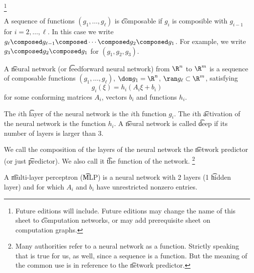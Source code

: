 
  \ifhmode\unskip\fi\footnote{
Future editions will include. Future editions may change the name of this sheet to \t{computation networks}, or may add prerequisite sheet on computation graphs.
  }


A sequence of functions $(g_1, \dots , g_\ell )$ is \t{composable} if $g_i$ is composible with $g_{i-1}$ for $i = 2, \dots , \ell $.
In this case we write $g_\ell  \composed g_{\ell -1} \composed \cdots \composed g_2 \composed g_1$. For example, we write $g_3 \composed g_2 \composed g_1$ for $(g_1, g_2, g_3)$.

A \t{neural network} (or \t{feedforward neural network}) from $\R ^n$ to $\R ^m$ is a sequence of composable functions $(g_1, \dots , g_{\ell })$, $\dom g_1 = \R ^n$, $\ran g_\ell  \subset \R ^m$, satisfying
  \[
g_i(\xi ) = h_i(A_i \xi  + b_i)
  \]
for some conforming matrices $A_i$, vectors $b_i$ and functions $h_i$.

The $i$th \t{layer} of the neural network is the $i$th function $g_i$.
The $i$th \t{activation} of the neural network is the function $h_i$.
A \t{neural network} is called \t{deep} if its number of layers is larger than 3.

We call the composition of the layers of the neural network the \t{network predictor} (or just \t{predictor}).
We also call it \t{the function} of the network.
  \ifhmode\unskip\fi\footnote{
Many authorities refer to a neural network as a function. Strictly speaking that is true for us, as well, since a sequence is a function. But the meaning of the common use is in reference to the \t{network predictor}.
  }

A \t{multi-layer perceptron} (\t{MLP}) is a neural network with 2 layers (1 \t{hidden layer}) and for which $A_i$ and $b_i$ have unrestricted nonzero entries.


%
%
%

\blankpage
